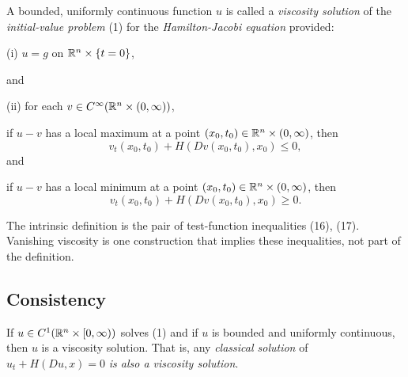 \begin{definition}
\label{def:viscosity-solution-cauchy-problem}

A bounded, uniformly continuous function $u$ is called a \textit{viscosity solution} of the \textit{initial-value problem} (1) for the \textit{Hamilton-Jacobi equation} provided:

(i) $u = g$ on $\mathbb{R}^n \times \{t = 0\}$,

and

(ii) for each $v \in C^\infty(\mathbb{R}^n \times (0,\infty))$,

if $u - v$ has a local maximum at a point $(x_0, t_0) \in \mathbb{R}^n \times (0,\infty)$, then
\[
v_t(x_0, t_0) + H(Dv(x_0, t_0), x_0) \leq 0,
\tag{16}
\]
and

if $u - v$ has a local minimum at a point $(x_0, t_0) \in \mathbb{R}^n \times (0,\infty)$, then
\[
v_t(x_0, t_0) + H(Dv(x_0, t_0), x_0) \geq 0.
\tag{17}
\]
\end{definition}

\begin{remark}
\label{rem:viscosity-solution-definition-emphasis}

The intrinsic definition is the pair of test-function inequalities (16), (17). Vanishing viscosity is one construction that implies these inequalities, not part of the definition.
\end{remark}

\subsection{Consistency}

\begin{proposition}
\label{prop:classical-solutions-are-viscosity-solutions}

If $u \in C^1(\mathbb{R}^n \times [0,\infty))$ solves (1) and if $u$ is bounded and uniformly continuous, then $u$ is a viscosity solution. That is, any \textit{classical solution} of $u_t + H(Du,x) = 0$ \textit{is also a viscosity solution}.
\end{proposition}

